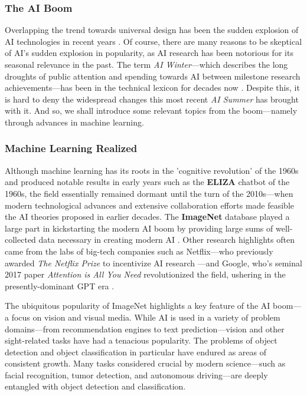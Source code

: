 \documentclass{report}
\newcommand{\tech}[1]{\textbf{#1}}
\begin{document}
\subsubsection{The AI Boom}
Overlapping the trend towards universal design has been the sudden explosion of AI technologies in recent years \cite{Knight_2023}. Of course, there are many reasons to be skeptical of AI's sudden explosion in popularity, as AI research has been notorious for its seasonal relevance in the past. The term \emph{AI Winter}---which describes the long droughts of public attention and spending towards AI between milestone research achievements---has been in the technical lexicon for decades now \cite{AIWinter}. Despite this, it is hard to deny the widespread changes this most recent \emph{AI Summer} has brought with it. And so, we shall introduce some relevant topics from the boom---namely through advances in machine learning. 

\subsubsection{Machine Learning Realized}
Although machine learning has its roots in the 'cognitive revolution' of the 1960s \cite{MILLER2003141} and produced notable results in early years such as the \tech{ELIZA} chatbot of the 1960s, \cite{ELIZA} the field essentially remained dormant until the turn of the 2010s---when modern technological advances and extensive collaboration efforts made feasible the AI theories proposed in earlier decades. The \tech{ImageNet} database played a large part in kickstarting the modern AI boom by providing large sums of well-collected data necessary in creating modern AI \cite{Gershgorn_2017}. Other research highlights often came from the labs of big-tech companies such as Netflix---who previously awarded \emph{The Netflix Prize} to incentivize AI research \cite{netflix}---and Google, who's seminal 2017 paper \emph{Attention is All You Need} \cite{vaswani2023attentionneed} revolutionized the field, ushering in the presently-dominant GPT era \cite{Love_2023}.   

The ubiquitous popularity of ImageNet highlights a key feature of the AI boom---a focus on vision and visual media. While AI is used in a variety of problem domains---from recommendation engines to text prediction---vision and other sight-related tasks have had a tenacious popularity. The problems of object detection and object classification in particular have endured as areas of consistent growth. Many tasks considered crucial by modern science---such as facial recognition, tumor detection, and autonomous driving---are deeply entangled with object detection and classification.
\end{document}

